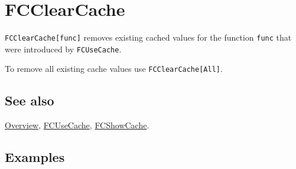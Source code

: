 \documentclass[../FeynCalcManual.tex]{subfiles}
\begin{document}
\hypertarget{fcclearcache}{
\section{FCClearCache}\label{fcclearcache}}

\texttt{FCClearCache[\allowbreak{}func]} removes existing cached values
for the function \texttt{func} that were introduced by
\texttt{FCUseCache}.

To remove all existing cache values use
\texttt{FCClearCache[\allowbreak{}All]}.

\subsection{See also}

\hyperlink{toc}{Overview}, \hyperlink{fcusecache}{FCUseCache},
\hyperlink{fcshowcache}{FCShowCache}.

\subsection{Examples}
\end{document}
